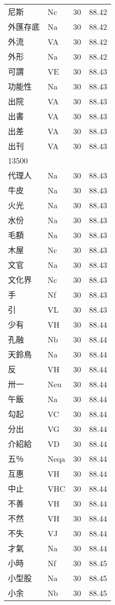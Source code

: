 \documentclass[twocolumn]{book}
\begin{document}
\begin{supertabular}{llrr}
尼斯 & Nc & 30 &  88.42\\
外匯存底 & Na & 30 &  88.42\\
外流 & VA & 30 &  88.42\\
外形 & Na & 30 &  88.42\\
可謂 & VE & 30 &  88.43\\
功能性 & Na & 30 &  88.43\\
出院 & VA & 30 &  88.43\\
出書 & VA & 30 &  88.43\\
出差 & VA & 30 &  88.43\\
出刊 & VA & 30 &  88.43\\
13500\\
代理人 & Na & 30 &  88.43\\
牛皮 & Na & 30 &  88.43\\
火光 & Na & 30 &  88.43\\
水份 & Na & 30 &  88.43\\
毛額 & Na & 30 &  88.43\\
木屋 & Nc & 30 &  88.43\\
文官 & Na & 30 &  88.43\\
文化界 & Nc & 30 &  88.43\\
手 & Nf & 30 &  88.43\\
引 & VL & 30 &  88.43\\
少有 & VH & 30 &  88.44\\
孔融 & Nb & 30 &  88.44\\
天鈴鳥 & Na & 30 &  88.44\\
反 & VH & 30 &  88.44\\
卅一 & Neu & 30 &  88.44\\
午飯 & Na & 30 &  88.44\\
勾起 & VC & 30 &  88.44\\
分出 & VG & 30 &  88.44\\
介紹給 & VD & 30 &  88.44\\
五％ & Neqa & 30 &  88.44\\
互惠 & VH & 30 &  88.44\\
中止 & VHC & 30 &  88.44\\
不善 & VH & 30 &  88.44\\
不然 & VH & 30 &  88.44\\
不失 & VJ & 30 &  88.44\\
才氣 & Na & 30 &  88.44\\
小時 & Nf & 30 &  88.45\\
小型股 & Na & 30 &  88.45\\
小余 & Nb & 30 &  88.45\\

\end{supertabular}
\end{document}

